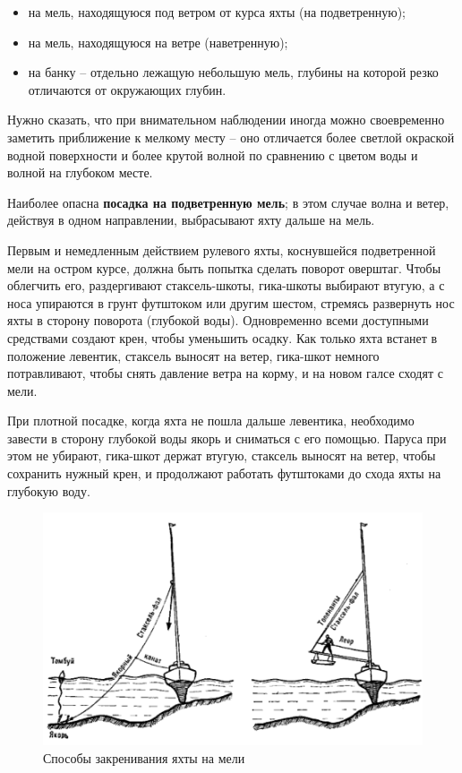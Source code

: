 \documentclass[a4paper, 12pt, twoside, final]{scrbook}
\begin{document}
\begin{itemize}
\item на мель, находящуюся под ветром от курса яхты (на подветренную);
\item на мель, находящуюся на ветре (наветренную);
\item на банку \--- отдельно лежащую небольшую мель, глубины на которой резко отличаются от окружающих глубин.
\end{itemize}

Нужно сказать, что при внимательном наблюдении иногда можно своевременно заметить приближение к мелкому месту \--- оно отличается более светлой окраской водной поверхности и более крутой волной по сравнению с цветом воды и волной на глубоком месте.

Наиболее опасна \textbf{посадка на подветренную мель}; в этом случае волна и ветер, действуя в одном направлении, выбрасывают яхту дальше на мель.

Первым и немедленным действием рулевого яхты, коснувшейся подветренной мели на остром курсе, должна быть попытка сделать поворот оверштаг. Чтобы облегчить его, раздергивают стаксель-шкоты, гика-шкоты выбирают втугую, а с носа упираются в грунт футштоком или другим шестом, стремясь развернуть нос яхты в сторону поворота (глубокой воды). Одновременно всеми доступными средствами создают крен, чтобы уменьшить осадку. Как только яхта встанет в положение левентик, стаксель выносят на ветер, гика-шкот немного потравливают, чтобы снять давление ветра на корму, и на новом галсе сходят с мели.

При плотной посадке, когда яхта не пошла дальше левентика, необходимо завести в сторону глубокой воды якорь и сниматься с его помощью. Паруса при этом не убирают, гика-шкот держат втугую, стаксель выносят на ветер, чтобы сохранить нужный крен, и продолжают работать футштоками до схода яхты на глубокую воду.

\begin{figure}[htbp]
   \centering
   \includegraphics{pics/139_Zakren_na_meli} %
   \caption{Способы закренивания яхты на мели}
   \label{fig:139}
\end{figure}
\end{document}
